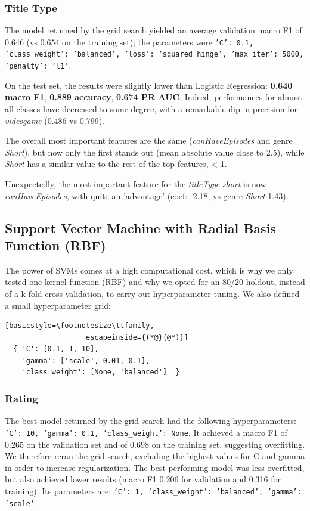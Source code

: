 \subsubsection{Title Type}
The model returned by the grid search yielded an average validation macro F1 of 0.646 (vs 0.654 on the training set); the parameters were \texttt{'C': 0.1, 'class\_weight': 'balanced', 'loss': 'squared\_hinge', 'max\_iter': 5000, 'penalty': 'l1'}.

On the test set, the results were slightly lower than Logistic Regression: \textbf{0.640 macro F1}, \textbf{0.889 accuracy}, \textbf{0.674 PR AUC}. Indeed, performances for almost all classes have decreased to some degree, with a remarkable dip in precision for \textit{videogame} (0.486 vs 0.799).

The overall most important features are the same (\textit{canHaveEpisodes} and genre \textit{Short}), but now only the first stands out (mean absolute value close to 2.5), while \textit{Short} has a similar value to the rest of the top features, < 1.

Unexpectedly, the most important feature for the \textit{titleType} \textit{short} is now \textit{canHaveEpisodes}, with quite an 'advantage' (coef: -2.18, vs genre \textit{Short} 1.43).

\subsection{Support Vector Machine with Radial Basis Function (RBF)}
The power of SVMs comes at a high computational cost, which is why we only tested one kernel function (RBF) and why we opted for an 80/20 holdout, instead of a k-fold cross-validation, to carry out hyperparameter tuning. We also defined a small hyperparameter grid: 
\begin{lstlisting}[basicstyle=\footnotesize\ttfamily,
                   escapeinside={(*@}{@*)}]
  { 'C': [0.1, 1, 10],
    'gamma': ['scale', 0.01, 0.1],
    'class_weight': [None, 'balanced']  }
\end{lstlisting}

\subsubsection{Rating}
The best model returned by the grid search had the following hyperparameters: \texttt{{'C': 10, 'gamma': 0.1, 'class\_weight': None}}. It achieved a macro F1 of 0.265 on the validation set and of 0.698 on the training set, suggesting overfitting.
We therefore reran the grid search, excluding the highest values for C and gamma in order to increase regularization. The best performing model was less overfitted, but also achieved lower results (macro F1 0.206 for validation and 0.316 for training). Its parameters are: \texttt{'C': 1, 'class\_weight': 'balanced', 'gamma': 'scale'}.


